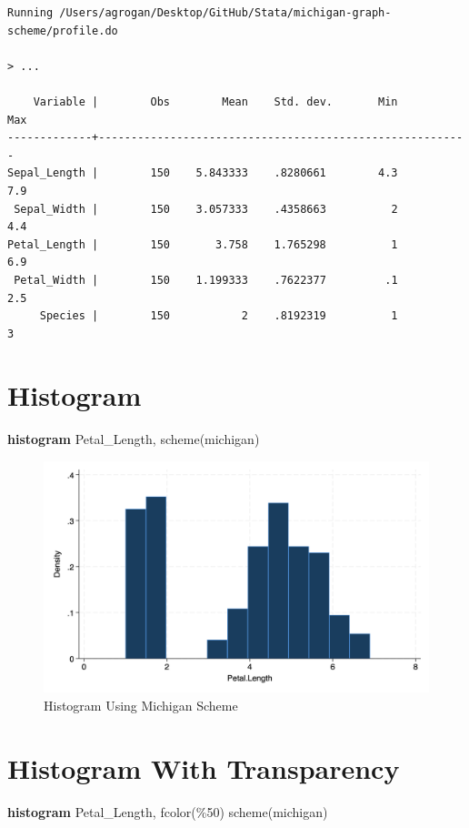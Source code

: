 \documentclass[
  letterpaper,
  DIV=11,
  numbers=noendperiod]{scrartcl}
\newenvironment{Shaded}{\begin{snugshade}}{\end{snugshade}}
\newcommand{\DecValTok}[1]{\textcolor[rgb]{0.68,0.00,0.00}{#1}}
\newcommand{\KeywordTok}[1]{\textcolor[rgb]{0.00,0.23,0.31}{\textbf{#1}}}
\newcommand{\NormalTok}[1]{\textcolor[rgb]{0.00,0.23,0.31}{#1}}
\begin{document}
\begin{verbatim}
Running /Users/agrogan/Desktop/GitHub/Stata/michigan-graph-scheme/profile.do 

> ...

    Variable |        Obs        Mean    Std. dev.       Min        Max
-------------+---------------------------------------------------------
Sepal_Length |        150    5.843333    .8280661        4.3        7.9
 Sepal_Width |        150    3.057333    .4358663          2        4.4
Petal_Length |        150       3.758    1.765298          1        6.9
 Petal_Width |        150    1.199333    .7622377         .1        2.5
     Species |        150           2    .8192319          1          3
\end{verbatim}

\section{Histogram}\label{histogram}

\begin{Shaded}
\begin{Highlighting}[]
\KeywordTok{histogram}\NormalTok{ Petal\_Length, }\DecValTok{scheme}\NormalTok{(michigan)}
\end{Highlighting}
\end{Shaded}

\begin{figure}[H]

{\centering \includegraphics[width=0.5\linewidth,height=\textheight,keepaspectratio]{myhistogram.png}

}

\caption{Histogram Using Michigan Scheme}

\end{figure}%

\section{Histogram With Transparency}\label{histogram-with-transparency}

\begin{Shaded}
\begin{Highlighting}[]
\KeywordTok{histogram}\NormalTok{ Petal\_Length, fcolor(\%50) }\DecValTok{scheme}\NormalTok{(michigan)}
\end{Highlighting}
\end{Shaded}
\end{document}
